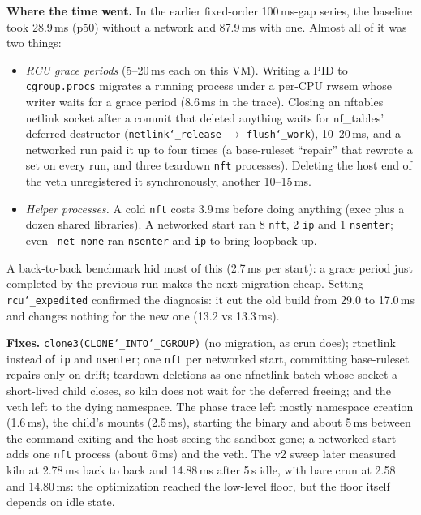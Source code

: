 \documentclass[10pt,letterpaper]{article}
\newcommand{\code}[1]{\texttt{#1}}
\newcommand{\us}{\char`\_}
\begin{document}
\textbf{Where the time went.} In the earlier fixed-order 100\,ms-gap series,
the baseline took 28.9\,ms (p50) without a network and 87.9\,ms with one.
Almost all of it was two things:
\begin{itemize}
\item \emph{RCU grace periods} (5--20\,ms each on this VM). Writing a PID to
\code{cgroup.procs} migrates a running process under a per-CPU rwsem whose
writer waits for a grace period (8.6\,ms in the trace). Closing an nftables
netlink socket after a commit that deleted anything waits for nf\_tables'
deferred destructor (\code{netlink\us{}release} $\rightarrow$ \code{flush\us{}work}),
10--20\,ms, and a networked run paid it up to four times (a base-ruleset
``repair'' that rewrote a set on every run, and three teardown \code{nft}
processes). Deleting the host end of the veth unregistered it synchronously,
another 10--15\,ms.
\item \emph{Helper processes.} A cold \code{nft} costs 3.9\,ms before doing
anything (exec plus a dozen shared libraries). A networked start ran 8
\code{nft}, 2 \code{ip} and 1 \code{nsenter}; even \code{--net none} ran
\code{nsenter} and \code{ip} to bring loopback up.
\end{itemize}
A back-to-back benchmark hid most of this (2.7\,ms per start): a grace period
just completed by the previous run makes the next migration cheap. Setting
\code{rcu\us{}expedited} confirmed the diagnosis: it cut the old build from 29.0 to
17.0\,ms and changes nothing for the new one (13.2 vs 13.3\,ms).

\textbf{Fixes.} \code{clone3(CLONE\us{}INTO\us{}CGROUP)} (no migration, as crun
does); rtnetlink instead of \code{ip} and \code{nsenter}; one \code{nft} per
networked start, committing base-ruleset repairs only on drift; teardown
deletions as one nfnetlink batch whose socket a short-lived child closes, so
kiln does not wait for the deferred freeing; and the veth left to the dying
namespace. The phase trace left mostly namespace creation (1.6\,ms), the
child's mounts (2.5\,ms), starting the binary and about 5\,ms between the
command exiting and the host seeing the sandbox gone; a networked start adds
one \code{nft} process (about 6\,ms) and the veth. The v2 sweep later measured
kiln at 2.78\,ms back to back and 14.88\,ms after 5\,s idle, with bare crun at
2.58 and 14.80\,ms: the optimization reached the low-level floor, but the
floor itself depends on idle state.
\end{document}
